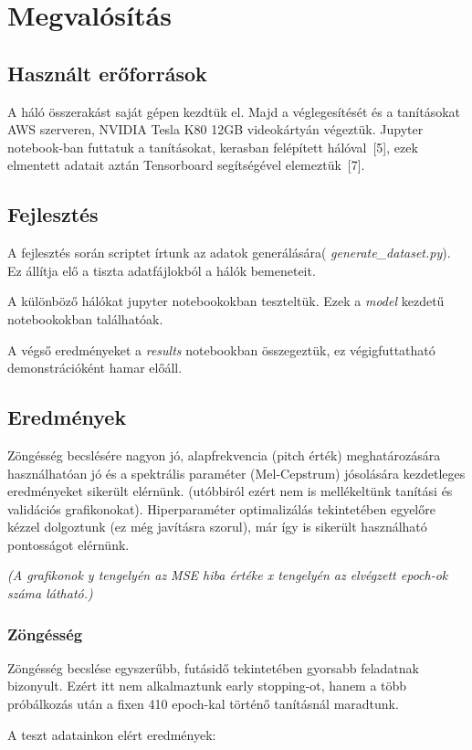\section{Megvalósítás}
\subsection{Használt erőforrások}
A háló összerakást saját gépen kezdtük el. Majd a véglegesítését és a tanításokat AWS szerveren, NVIDIA Tesla K80 12GB videokártyán végeztük. Jupyter notebook-ban futtatuk a tanításokat, kerasban felépített hálóval\ [5], ezek elmentett adatait aztán Tensorboard segítségével elemeztük\ [7].
\subsection{Fejlesztés}
A fejlesztés során scriptet írtunk az adatok generálására( {\it generate\_dataset.py}). Ez állítja elő a tiszta adatfájlokból a hálók bemeneteit.

A különböző hálókat jupyter notebookokban teszteltük. Ezek a {\it model} kezdetű notebookokban találhatóak.

A végső eredményeket a {\it results} notebookban összegeztük, ez végigfuttatható demonstrációként hamar előáll. 
\subsection{Eredmények}
Zöngésség becslésére nagyon jó, alapfrekvencia (pitch érték) meghatározására használhatóan jó és a spektrális paraméter (Mel-Cepstrum) jósolására kezdetleges eredményeket sikerült elérnünk. (utóbbiról ezért nem is mellékeltünk tanítási és validációs grafikonokat). Hiperparaméter optimalizálás tekintetében egyelőre kézzel dolgoztunk (ez még javításra szorul), már így is sikerült használható pontosságot  elérnünk.

\textit{(A grafikonok y tengelyén az MSE hiba értéke x tengelyén az elvégzett epoch-ok száma látható.)}

\subsubsection{Zöngésség}
	Zöngésség becslése egyszerűbb, futásidő tekintetében gyorsabb feladatnak bizonyult. Ezért itt nem alkalmaztunk early stopping-ot, hanem a több próbálkozás után a fixen 410 epoch-kal történő tanításnál maradtunk.
	
	A teszt adatainkon elért eredmények:
	
